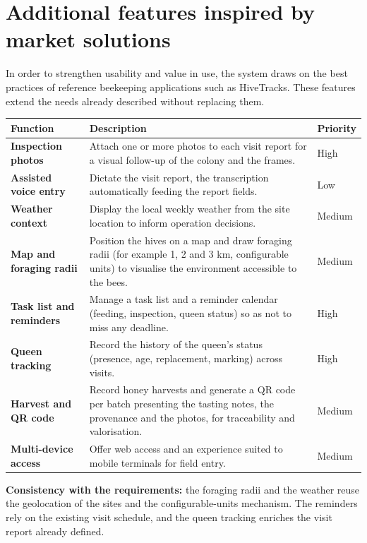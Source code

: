 \section{Additional features inspired by market solutions}
In order to strengthen usability and value in use, the system draws on the best
practices of reference beekeeping applications such as HiveTracks. These
features extend the needs already described without replacing them.
\begin{xltabular}{\textwidth}{>{\bfseries}p{4.2cm} X C{2.1cm}}
\toprule
\textbf{Function} & \textbf{Description} & \textbf{Priority} \\
\midrule
\endhead
Inspection photos & Attach one or more photos to each visit report for a visual follow-up of the colony and the frames. & High \\
Assisted voice entry & Dictate the visit report, the transcription automatically feeding the report fields. & Low \\
Weather context & Display the local weekly weather from the site location to inform operation decisions. & Medium \\
Map and foraging radii & Position the hives on a map and draw foraging radii (for example 1, 2 and 3 km, configurable units) to visualise the environment accessible to the bees. & Medium \\
Task list and reminders & Manage a task list and a reminder calendar (feeding, inspection, queen status) so as not to miss any deadline. & High \\
Queen tracking & Record the history of the queen's status (presence, age, replacement, marking) across visits. & High \\
Harvest and QR code & Record honey harvests and generate a QR code per batch presenting the tasting notes, the provenance and the photos, for traceability and valorisation. & Medium \\
Multi-device access & Offer web access and an experience suited to mobile terminals for field entry. & Medium \\
\bottomrule
\end{xltabular}
\begin{encadre}
\textbf{Consistency with the requirements:} the foraging radii and the weather
reuse the geolocation of the sites and the configurable-units mechanism. The
reminders rely on the existing visit schedule, and the queen tracking enriches
the visit report already defined.
\end{encadre}

